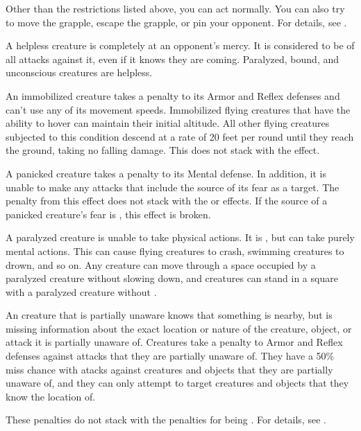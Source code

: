     Other than the restrictions listed above, you can act normally. You can also try to move the grapple, escape the grapple, or pin your opponent. For details, see .

     A helpless creature is completely at an opponent's mercy.
    It is considered to be \unaware of all attacks against it, even if it knows they are coming.
    Paralyzed, bound, and unconscious creatures are helpless.

     An immobilized creature takes a  penalty to its Armor and Reflex defenses and can't use any of its movement speeds.
    Immobilized flying creatures that have the ability to hover can maintain their initial altitude.
    All other flying creatures subjected to this condition descend at a rate of 20 feet per round until they reach the ground, taking no falling damage.
    This does not stack with the \slowed effect.

     A panicked creature takes a  penalty to its Mental defense.
    In addition, it is unable to make any attacks that include the source of its fear as a target.
    The penalty from this effect does not stack with the \frightened or \panicked effects.
    If the source of a panicked creature's fear is , this effect is broken.

     A paralyzed creature is unable to take physical actions. It is \helpless, but can take purely mental actions. This can cause flying creatures to crash, swimming creatures to drown, and so on. Any creature can move through a space occupied by a paralyzed creature without slowing down, and creatures can stand in a square with a paralyzed creature without \squeezing.

     An creature that is partially unaware knows that something is nearby, but is missing information about the exact location or nature of the creature, object, or attack it is partially unaware of.
    Creatures take a  penalty to Armor and Reflex defenses against attacks that they are partially unaware of.
    They have a 50\% miss chance with  atacks against creatures and objects that they are partially unaware of, and they can only attempt to target creatures and objects that they know the location of.

    These penalties do not stack with the penalties for being \unaware.
    For details, see .

